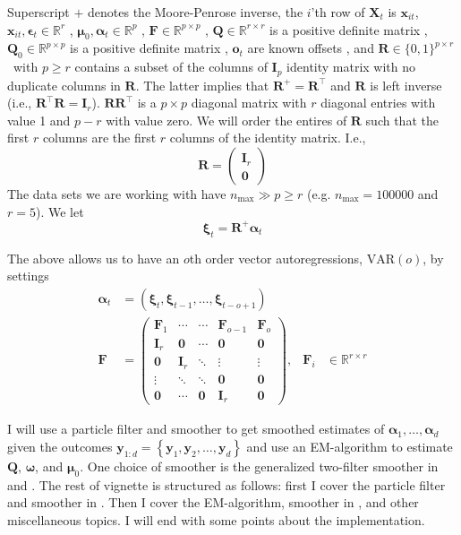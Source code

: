 \documentclass[notitlepage]{article}
\renewcommand{\vec}[1]{\bm{#1}}
\newcommand{\mat}[1]{\mathbf{#1}}
\newcommand{\Lbrace}[1]{\left\{ #1\right\}}
\newcommand{\Lparen}[1]{\left( #1\right)}
\newcommand{\optor}[2]{#1\Lparen{#2}}
\newcommand{\dimState}{p}
\newcommand{\dimRng}{r}
\newcommand{\nPeriods}{d}
\newcommand{\nMax}{n_{\text{max}}}
\newcommand\MVAR[1]{\optor{\text{VAR}}{#1}}
\begin{document}
Superscript $+$ denotes the Moore-Penrose inverse, %
the $i$'th row of $\mat{X}_t$ is $\vec{x}_{it}$, $\vec{x}_{it},\vec{\epsilon}_t\in\mathbb{R}^\dimRng$%
, $\vec\mu_0,\vec{\alpha}_t\vec\in\mathbb{R}^\dimState$%
, $\mat{F} \in \mathbb{R}^{\dimState\times\dimState}$%
, $\mat{Q} \in \mathbb{R}^{\dimRng\times\dimRng}$ is a positive definite matrix%
, $\mat{Q}_0 \in \mathbb{R}^{\dimState\times\dimState}$ is a positive definite matrix%
, $\vec{o}_t$ are known offsets%
, and $\mat{R} \in \{0,1\}^{\dimState\times \dimRng}$%
~with $\dimState\geq\dimRng$ contains a subset of the columns of $\mat{I}_{\dimState}$ identity matrix with no duplicate columns in $\mat{R}$. The latter implies that $\mat{R}^+ = \mat{R}^\top$ and $\mat{R}$ is left inverse (i.e., $\mat{R}^\top\mat{R} = \mat{I}_\dimRng$). $\mat{R}\mat{R}^\top$ is a $\dimState\times\dimState$ diagonal matrix with $\dimRng$ diagonal entries with value 1 and $\dimState - \dimRng$ with value zero. 
We will order the entires of $\mat R$ such that the first $\dimRng$ columns are the 
first $\dimRng$ columns of the identity matrix. I.e.,%
%
$$\mat{R} = \begin{pmatrix}
	\mat I_\dimRng  \\
	\mat 0 
\end{pmatrix}$$%
%
The data sets we are working with have 
$\nMax \gg \dimState \geq \dimRng$ (e.g. $\nMax = 100000$ and $\dimRng = 5$). We let %
%
$$\vec{\xi}_{t} = \mat{R}^{+}\vec{\alpha}_t$$

The above allows us to have an $o$th order vector autoregressions, $\MVAR{o}$, by settings%
%
\begin{align*}
\vec\alpha_t &= (\vec\xi_t,\vec\xi_{t-1},\dots, \vec\xi_{t - o + 1}) \\
\mat F &= \begin{pmatrix}
 \mat F_1    & \cdots & \cdots & \mat F_{o-1} & \mat F_o \\
 \mat I_\dimRng    & \mat 0      & \cdots & \mat 0 & \mat 0 \\
 \mat 0      &  \mat I_\dimRng    & \ddots & \vdots & \vdots \\
 \vdots & \ddots & \ddots & \mat 0 & \mat 0 \\
 \mat 0      & \cdots & \mat 0 & \mat I_\dimRng & \mat 0 
\end{pmatrix}, & \mat F_i &\in \mathbb{R}^{\dimRng\times\dimRng}
\end{align*}

I will use a particle filter and smoother to get smoothed estimates of 
$\vec{\alpha}_1, \dots, \vec{\alpha}_\nPeriods$ given the outcomes 
$\vec{y}_{1:\nPeriods} = \Lbrace{\vec{y}_1,\vec{y}_2,\dots, \vec{y}_\nPeriods}$ and use 
an EM-algorithm to estimate $\mat{Q}$, $\vec\omega$, and $\vec\mu_0$. One choice of smoother is 
the generalized two-filter smoother in \cite{fearnhead10} and \cite{briers09}. The rest of
 vignette is structured as follows: first I cover the particle filter and smoother in \cite{fearnhead10}. Then 
 I cover the EM-algorithm, smoother in \cite{briers09}, and other miscellaneous topics. I will end with some points
  about the implementation.
\end{document}
